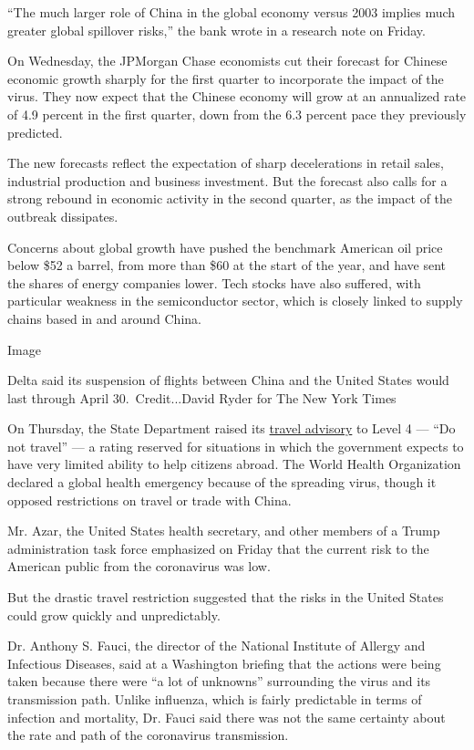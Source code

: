 ``The much larger role of China in the global economy versus 2003
implies much greater global spillover risks,'' the bank wrote in a
research note on Friday.

On Wednesday, the JPMorgan Chase economists cut their forecast for
Chinese economic growth sharply for the first quarter to incorporate the
impact of the virus. They now expect that the Chinese economy will grow
at an annualized rate of 4.9 percent in the first quarter, down from the
6.3 percent pace they previously predicted.

The new forecasts reflect the expectation of sharp decelerations in
retail sales, industrial production and business investment. But the
forecast also calls for a strong rebound in economic activity in the
second quarter, as the impact of the outbreak dissipates.

Concerns about global growth have pushed the benchmark American oil
price below \$52 a barrel, from more than \$60 at the start of the year,
and have sent the shares of energy companies lower. Tech stocks have
also suffered, with particular weakness in the semiconductor sector,
which is closely linked to supply chains based in and around China.

Image

Delta said its suspension of flights between China and the United States
would last through April 30.~Credit...David Ryder for The New York Times

On Thursday, the State Department raised its
\href{https://www.nytimes3xbfgragh.onion/2020/01/30/world/asia/Coronavirus-travel-advisory-.html}{travel
advisory} to Level 4 --- ``Do not travel'' --- a rating reserved for
situations in which the government expects to have very limited ability
to help citizens abroad. The World Health Organization declared a global
health emergency because of the spreading virus, though it opposed
restrictions on travel or trade with China.

Mr. Azar, the United States health secretary, and other members of a
Trump administration task force emphasized on Friday that the current
risk to the American public from the coronavirus was low.

But the drastic travel restriction suggested that the risks in the
United States could grow quickly and unpredictably.

Dr. Anthony S. Fauci, the director of the National Institute of Allergy
and Infectious Diseases, said at a Washington briefing that the actions
were being taken because there were ``a lot of unknowns'' surrounding
the virus and its transmission path. Unlike influenza, which is fairly
predictable in terms of infection and mortality, Dr. Fauci said there
was not the same certainty about the rate and path of the coronavirus
transmission.

